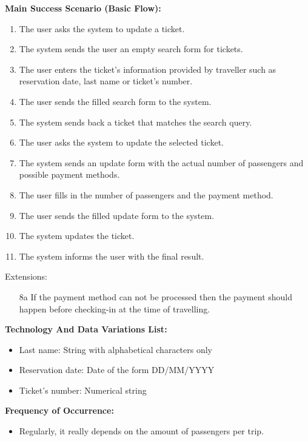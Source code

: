 \textbf{Main Success Scenario (Basic Flow):}
\begin{enumerate}
\item The user asks the system to update a ticket.
\item The system sends the user an empty search form for tickets.
\item The user enters the ticket's information provided by traveller such as reservation date, last name or ticket's number.
\item The user sends the filled search form to the system.
\item The system sends back a ticket that matches the search query.
\item The user asks the system to update the selected ticket.
\item The system sends an update form with the actual number of passengers and possible payment methods.
\item The user fills in the number of passengers and the payment method.
\item The user sends the filled update form to the system.
\item The system updates the ticket.
\item The system informs the user with the final result.
\end{enumerate}
Extensions:
\begin{enumerate}
\item[8a] If the payment method can not be processed then the payment should happen before checking-in at the time of travelling.
\end{enumerate}


\textbf{Technology And Data Variations List:} 
\begin{itemize}
    \item Last name: String with alphabetical characters only
    \item Reservation date: Date of the form DD/MM/YYYY
    \item Ticket's number: Numerical string
    \end{itemize}
\textbf{Frequency of Occurrence:} 
\begin{itemize}
    \item Regularly, it really depends on the amount of passengers per trip.
\end{itemize} 

